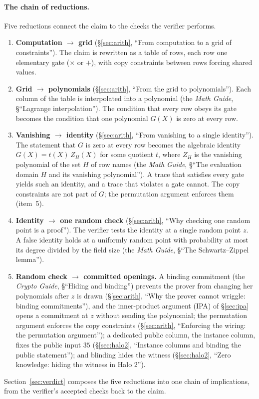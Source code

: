 \documentclass[11pt,a4paper]{article}
\theoremstyle{definition}
\newcommand{\ZH}{Z_H}
\begin{document}
\paragraph{The chain of reductions.} Five reductions connect the claim
to the checks the verifier performs.
\begin{enumerate}[leftmargin=*,itemsep=1pt]
\item \textbf{Computation $\to$ grid} (\S\ref{sec:arith}, ``From
computation to a grid of constraints''). The claim is rewritten as a
table of rows, each row one elementary gate ($\times$ or $+$), with copy
constraints between rows forcing shared values.
\item \textbf{Grid $\to$ polynomials} (\S\ref{sec:arith}, ``From the
grid to polynomials''). Each column of the table is interpolated into a
polynomial (the \emph{Math Guide}, \S``Lagrange interpolation''). The
condition that every row obeys its gate becomes the condition that one
polynomial $G(X)$ is zero at every row.
\item \textbf{Vanishing $\to$ identity} (\S\ref{sec:arith}, ``From
vanishing to a single identity''). The statement that $G$ is zero at
every row becomes the algebraic identity $G(X) = t(X)\,\ZH(X)$ for some
quotient $t$, where $\ZH$ is the vanishing polynomial of the set $H$ of
row names (the \emph{Math Guide}, \S``The evaluation domain $H$ and its
vanishing polynomial''). A trace that satisfies every gate yields such
an identity, and a trace that violates a gate cannot. The copy
constraints are not part of $G$; the permutation argument enforces them
(item~5).
\item \textbf{Identity $\to$ one random check} (\S\ref{sec:arith},
``Why checking one random point is a proof''). The verifier tests the
identity at a single random point $z$. A false identity holds at a
uniformly random point with probability at most its degree divided by
the field size (the \emph{Math Guide}, \S``The Schwartz--Zippel
lemma'').
\item \textbf{Random check $\to$ committed openings.} A binding
commitment (the \emph{Crypto Guide}, \S``Hiding and binding'') prevents
the prover from changing her polynomials after $z$ is drawn
(\S\ref{sec:arith}, ``Why the prover cannot wriggle: binding
commitments''), and the inner-product argument (IPA) of
\S\ref{sec:ipa} opens a commitment at $z$ without sending the
polynomial; the permutation argument enforces the copy constraints
(\S\ref{sec:arith}, ``Enforcing the wiring: the permutation argument'');
a dedicated public column, the instance column, fixes the public input
$35$ (\S\ref{sec:halo2}, ``Instance columns and binding the public
statement''); and blinding hides the witness (\S\ref{sec:halo2}, ``Zero
knowledge: hiding the witness in Halo 2'').
\end{enumerate}
Section~\ref{sec:verdict} composes the five reductions into one chain
of implications, from the verifier's accepted checks back to the claim.
\end{document}
